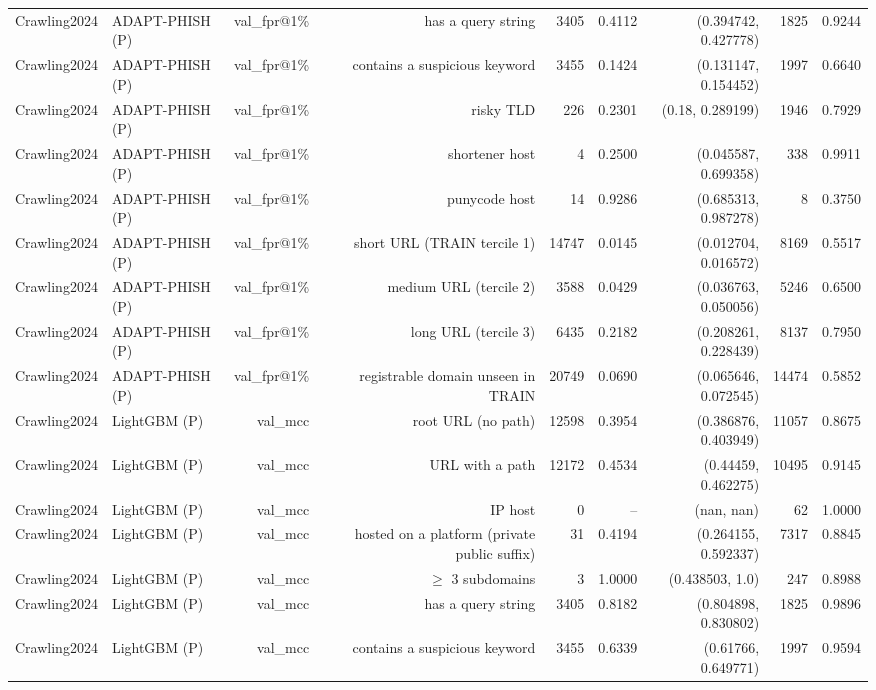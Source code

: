 \begin{table}[t]
\begin{tabular}{llrrrrrrr}
Crawling2024 & ADAPT-PHISH (P) & val\_fpr@1\% & has a query string & 3405 & 0.4112 & (0.394742, 0.427778) & 1825 & 0.9244 \\
Crawling2024 & ADAPT-PHISH (P) & val\_fpr@1\% & contains a suspicious keyword & 3455 & 0.1424 & (0.131147, 0.154452) & 1997 & 0.6640 \\
Crawling2024 & ADAPT-PHISH (P) & val\_fpr@1\% & risky TLD & 226 & 0.2301 & (0.18, 0.289199) & 1946 & 0.7929 \\
Crawling2024 & ADAPT-PHISH (P) & val\_fpr@1\% & shortener host & 4 & 0.2500 & (0.045587, 0.699358) & 338 & 0.9911 \\
Crawling2024 & ADAPT-PHISH (P) & val\_fpr@1\% & punycode host & 14 & 0.9286 & (0.685313, 0.987278) & 8 & 0.3750 \\
Crawling2024 & ADAPT-PHISH (P) & val\_fpr@1\% & short URL (TRAIN tercile 1) & 14747 & 0.0145 & (0.012704, 0.016572) & 8169 & 0.5517 \\
Crawling2024 & ADAPT-PHISH (P) & val\_fpr@1\% & medium URL (tercile 2) & 3588 & 0.0429 & (0.036763, 0.050056) & 5246 & 0.6500 \\
Crawling2024 & ADAPT-PHISH (P) & val\_fpr@1\% & long URL (tercile 3) & 6435 & 0.2182 & (0.208261, 0.228439) & 8137 & 0.7950 \\
Crawling2024 & ADAPT-PHISH (P) & val\_fpr@1\% & registrable domain unseen in TRAIN & 20749 & 0.0690 & (0.065646, 0.072545) & 14474 & 0.5852 \\
Crawling2024 & LightGBM (P) & val\_mcc & root URL (no path) & 12598 & 0.3954 & (0.386876, 0.403949) & 11057 & 0.8675 \\
Crawling2024 & LightGBM (P) & val\_mcc & URL with a path & 12172 & 0.4534 & (0.44459, 0.462275) & 10495 & 0.9145 \\
Crawling2024 & LightGBM (P) & val\_mcc & IP host & 0 & -- & (nan, nan) & 62 & 1.0000 \\
Crawling2024 & LightGBM (P) & val\_mcc & hosted on a platform (private public suffix) & 31 & 0.4194 & (0.264155, 0.592337) & 7317 & 0.8845 \\
Crawling2024 & LightGBM (P) & val\_mcc & $\geq$ 3 subdomains & 3 & 1.0000 & (0.438503, 1.0) & 247 & 0.8988 \\
Crawling2024 & LightGBM (P) & val\_mcc & has a query string & 3405 & 0.8182 & (0.804898, 0.830802) & 1825 & 0.9896 \\
Crawling2024 & LightGBM (P) & val\_mcc & contains a suspicious keyword & 3455 & 0.6339 & (0.61766, 0.649771) & 1997 & 0.9594 \\

\end{tabular}
\end{table}
